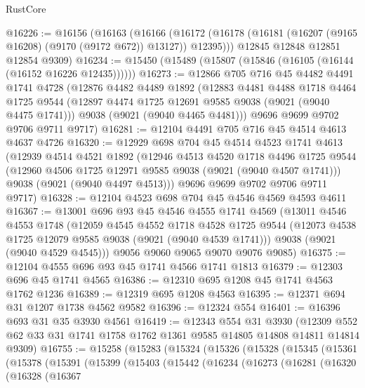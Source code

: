 \begin{lexlean}{RustCore}
\begin{coremodule}
@16226 := @16156
    (@16163
      (@16166 (@16172 (@16178 (@16181 (@16207 (@9165 @16208) (@9170 (@9172 @672)) @13127)) @12395)))
      @12845
      @12848
      @12851
      @12854
      @9309)
@16234 := @15450 (@15489 (@15807 (@15846 (@16105 (@16144 (@16152 @16226 @12435))))))
@16273 := @12866
    @705
    @716
    @45
    @4482
    @4491
    @1741
    @4728
    (@12876
      @4482
      @4489
      @1892
      (@12883
        @4481
        @4488
        @1718
        @4464
        @1725
        @9544
        (@12897 @4474 @1725 @12691 @9585 @9038 (@9021 (@9040 @4475 @1741)))
        @9038
        (@9021 (@9040 @4465 @4481)))
      @9696
      @9699
      @9702
      @9706
      @9711
      @9717)
@16281 := @12104 @4491 @705 @716 @45 @4514 @4613 @4637 @4726
@16320 := @12929
    @698
    @704
    @45
    @4514
    @4523
    @1741
    @4613
    (@12939
      @4514
      @4521
      @1892
      (@12946
        @4513
        @4520
        @1718
        @4496
        @1725
        @9544
        (@12960 @4506 @1725 @12971 @9585 @9038 (@9021 (@9040 @4507 @1741)))
        @9038
        (@9021 (@9040 @4497 @4513)))
      @9696
      @9699
      @9702
      @9706
      @9711
      @9717)
@16328 := @12104 @4523 @698 @704 @45 @4546 @4569 @4593 @4611
@16367 := @13001
    @696
    @93
    @45
    @4546
    @4555
    @1741
    @4569
    (@13011
      @4546
      @4553
      @1748
      (@12059
        @4545
        @4552
        @1718
        @4528
        @1725
        @9544
        (@12073 @4538 @1725 @12079 @9585 @9038 (@9021 (@9040 @4539 @1741)))
        @9038
        (@9021 (@9040 @4529 @4545)))
      @9056
      @9060
      @9065
      @9070
      @9076
      @9085)
@16375 := @12104 @4555 @696 @93 @45 @1741 @4566 @1741 @1813
@16379 := @12303 @696 @45 @1741 @4565
@16386 := @12310 @695 @1208 @45 @1741 @4563 @1762 @1236
@16389 := @12319 @695 @1208 @4563
@16395 := @12371 @694 @31 @1207 @1738 @4562 @9582
@16396 := @12324 @554
@16401 := @16396 @693 @31 @35 @3930 @4561
@16419 := @12343
    @554
    @31
    @3930
    (@12309 @552 @62 @33 @31 @1741 @1758 @1762 @1361 @9585 @14805 @14808 @14811 @14814 @9309)
@16755 := @15258
    (@15283
      (@15324
        (@15326
          (@15328
            (@15345
              (@15361
                (@15378
                  (@15391
                    (@15399
                      (@15403
                        (@15442
                          (@16234
                            (@16273
                              (@16281
                                (@16320
                                  (@16328
                                    (@16367

\end{coremodule}
\end{lexlean}

